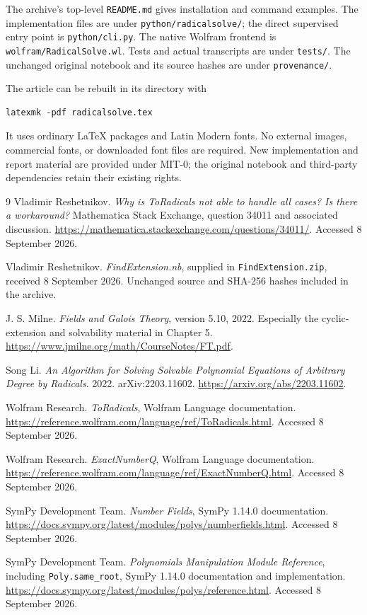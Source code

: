 \documentclass[11pt]{article}
\theoremstyle{definition}\newtheorem{definition}[theorem]{Definition}
\theoremstyle{remark}\newtheorem{remark}[theorem]{Remark}
\newcommand{\code}[1]{\texttt{#1}}
\begin{document}
The archive's top-level \code{README.md} gives installation and command examples.
The implementation files are under \code{python/radicalsolve/}; the direct
supervised entry point is \code{python/cli.py}. The native Wolfram frontend is
\code{wolfram/RadicalSolve.wl}. Tests and actual transcripts are under
\code{tests/}. The unchanged original notebook and its source hashes are under
\code{provenance/}.

The article can be rebuilt in its directory with
\begin{lstlisting}
latexmk -pdf radicalsolve.tex
\end{lstlisting}
It uses ordinary LaTeX packages and Latin Modern fonts. No external images,
commercial fonts, or downloaded font files are required. New implementation
and report material are provided under MIT-0; the original notebook and
third-party dependencies retain their existing rights.

\begin{thebibliography}{9}
Vladimir Reshetnikov.
\emph{Why is ToRadicals not able to handle all cases? Is there a workaround?}
Mathematica Stack Exchange, question 34011 and associated discussion.
\url{https://mathematica.stackexchange.com/questions/34011/}.
Accessed 8 September 2026.

Vladimir Reshetnikov.
\emph{FindExtension.nb}, supplied in \code{FindExtension.zip}, received
8 September 2026. Unchanged source and SHA-256 hashes included in the archive.

J. S. Milne. \emph{Fields and Galois Theory}, version 5.10, 2022.
Especially the cyclic-extension and solvability material in Chapter 5.
\url{https://www.jmilne.org/math/CourseNotes/FT.pdf}.

Song Li. \emph{An Algorithm for Solving Solvable Polynomial Equations of
Arbitrary Degree by Radicals}. 2022. arXiv:2203.11602.
\url{https://arxiv.org/abs/2203.11602}.

Wolfram Research. \emph{ToRadicals}, Wolfram Language documentation.
\url{https://reference.wolfram.com/language/ref/ToRadicals.html}.
Accessed 8 September 2026.

Wolfram Research. \emph{ExactNumberQ}, Wolfram Language documentation.
\url{https://reference.wolfram.com/language/ref/ExactNumberQ.html}.
Accessed 8 September 2026.

SymPy Development Team. \emph{Number Fields}, SymPy 1.14.0 documentation.
\url{https://docs.sympy.org/latest/modules/polys/numberfields.html}.
Accessed 8 September 2026.

SymPy Development Team. \emph{Polynomials Manipulation Module Reference},
including \code{Poly.same\_root}, SymPy 1.14.0 documentation and implementation.
\url{https://docs.sympy.org/latest/modules/polys/reference.html}.
Accessed 8 September 2026.
\end{thebibliography}
\end{document}
